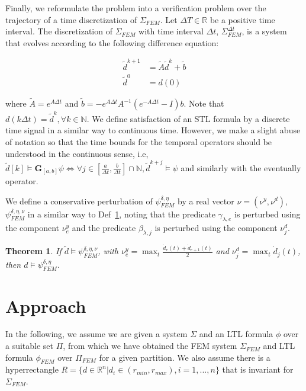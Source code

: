 \documentclass{article}
\newtheorem{theorem}{Theorem}
\newcommand*{\R}{\mathbb{R}}
\newcommand*{\N}{\mathbb{N}}
\newcommand{\Always}{\mathbf{G}}
\begin{document}
Finally, we reformulate the problem into a verification problem over the
trajectory of a time discretization of $\Sigma_{FEM}$. Let $\Delta T \in \R$ be
a positive time interval. The discretization of $\Sigma_{FEM}$ with time
interval $\Delta t$, $\Sigma^{\Delta t}_{FEM}$, is a system that evolves
according to the following difference equation:

\begin{equation}
    \begin{aligned}
        \tilde d^{k+1} &= \tilde A \tilde d^k + \tilde b \\
        \tilde d^0 &= d(0)
    \end{aligned}
\end{equation}

where $\tilde A = e^{A \Delta t}$ and $\tilde b = - e^{A \Delta t} A^{-1} \left
( e^{- A \Delta t} - I \right ) b$. Note that $d(k \Delta t) = \tilde d^k,
\forall k \in \N$. We define satisfaction of an STL formula by a discrete time
signal in a similar way to continuous time. However, we make a slight abuse of
notation so that the time bounds for the temporal operators should be understood
in the continuous sense, i.e, $\tilde d[k] \models \Always_{[a, b]} \psi \iff 
\forall j \in [\frac{a}{\Delta t}, \frac{b}{\Delta t}] \cap \N, \tilde d^{k + j} \models
\psi$ and similarly with the eventually operator.

We define a conservative perturbation of $\psi^{\delta, \eta}_{FEM}$ by a real
vector $\nu = (\nu^y, \nu^d)$, $\psi^{\delta, \eta, \nu}_{FEM}$ in a similar way to Def~\ref{},
noting that the predicate $\gamma_{\lambda, e}$ is perturbed using the component
$\nu^y_e$ and the predicate $\beta_{\lambda, j}$ is perturbed using the
component $\nu^d_j$.

\begin{theorem}
    If $\tilde d \models \psi^{\delta, \eta, \nu}_{FEM}$, with
    $\nu^y_e = \max_t \frac{\dot d_e(t) + \dot d_{e+1}(t)}{2}$ and $\nu^d_j = \max_t
    \dot d_j(t)$, then $d \models \psi^{\delta, \eta}_{FEM}$.
\end{theorem}

\iffalse
\section{Approach}

In the following, we assume we are given a system $\Sigma$ and an LTL formula
$\phi$ over a suitable set $\Pi$, from which we have obtained the 
FEM system $\Sigma_{FEM}$ and LTL formula $\phi_{FEM}$ over $\Pi_{FEM}$ for a
given partition. We also assume there is a hyperrectangle $R = \{d \in \R^n |
d_i \in (r_{min}, r_{max}), i = 1,...,n\}$ that is invariant for $\Sigma_{FEM}$.
\end{document}
